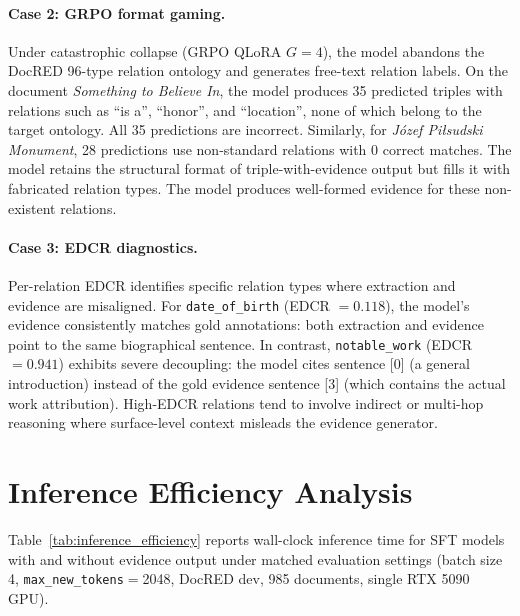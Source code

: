 \paragraph{Case 2: GRPO format gaming.}
Under catastrophic collapse (GRPO QLoRA $G{=}4$), the model abandons the DocRED 96-type relation ontology and generates free-text relation labels. On the document \emph{Something to Believe In}, the model produces 35 predicted triples with relations such as ``is a'', ``honor'', and ``location'', none of which belong to the target ontology. All 35 predictions are incorrect. Similarly, for \emph{J\'{o}zef Pi\l{}sudski Monument}, 28 predictions use non-standard relations with 0 correct matches. The model retains the structural format of triple-with-evidence output but fills it with fabricated relation types. The model produces well-formed evidence for these non-existent relations.

\paragraph{Case 3: EDCR diagnostics.}
Per-relation EDCR identifies specific relation types where extraction and evidence are misaligned. For \texttt{date\_of\_birth} (EDCR $= 0.118$), the model's evidence consistently matches gold annotations: both extraction and evidence point to the same biographical sentence. In contrast, \texttt{notable\_work} (EDCR $= 0.941$) exhibits severe decoupling: the model cites sentence [0] (a general introduction) instead of the gold evidence sentence [3] (which contains the actual work attribution). High-EDCR relations tend to involve indirect or multi-hop reasoning where surface-level context misleads the evidence generator.


\section{Inference Efficiency Analysis}
\label{sec:inference_efficiency}

Table~\ref{tab:inference_efficiency} reports wall-clock inference time for SFT models with and without evidence output under matched evaluation settings (batch size 4, \texttt{max\_new\_tokens}$=$2048, DocRED dev, 985 documents, single RTX 5090 GPU).

